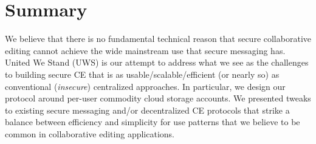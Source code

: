\documentclass[runningheads]{llncs}
\begin{document}
\section{Summary}

We believe that there is no fundamental technical reason that secure collaborative editing cannot achieve the wide mainstream use that secure messaging has.
United We Stand (UWS) is our attempt to address what we see as the challenges to building secure CE that is as usable{\slash}scalable{\slash}efficient (or nearly so) as conventional (\emph{insecure}) centralized approaches.
In particular, we design our protocol around per-user commodity cloud storage accounts.
We presented tweaks to existing secure messaging and{\slash}or decentralized CE protocols that strike a balance between efficiency and simplicity for use patterns that we believe to be common in collaborative editing applications.



\end{document}
